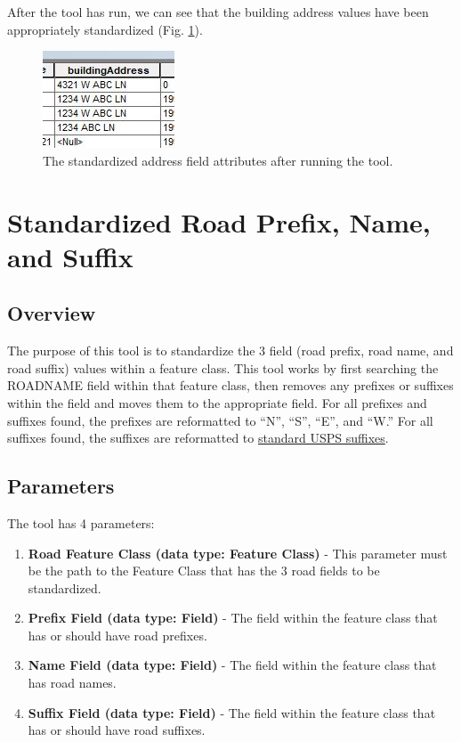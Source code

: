 \documentclass[openany]{book}
\providecommand{\tightlist}{%
  \setlength{\itemsep}{0pt}\setlength{\parskip}{0pt}}
\theoremstyle{definition}
\theoremstyle{definition}
\theoremstyle{definition}
\theoremstyle{remark}
\begin{document}
After the tool has run, we can see that the building address values have
been appropriately standardized (Fig. \ref{fig:std1after}).

\begin{figure}[H]

{\centering \includegraphics{figures/std1-after} 

}

\caption{The standardized address field attributes after running the tool.}\label{fig:std1after}
\end{figure}

\hypertarget{std3}{\chapter{Standardized Road Prefix, Name, and
Suffix}\label{std3}}

\section{Overview}\label{overview-7}

The purpose of this tool is to standardize the 3 field (road prefix,
road name, and road suffix) values within a feature class. This tool
works by first searching the ROADNAME field within that feature class,
then removes any prefixes or suffixes within the field and moves them to
the appropriate field. For all prefixes and suffixes found, the prefixes
are reformatted to ``N'', ``S'', ``E'', and ``W.'' For all suffixes
found, the suffixes are reformatted to
\href{https://github.com/allanbreyes/udacity-data-science/blob/master/p2/data/suffixes.csv}{standard
USPS suffixes}.

\section{Parameters}\label{parameters-7}

The tool has 4 parameters:

\begin{enumerate}
\def\labelenumi{\arabic{enumi}.}
\tightlist
\item
  \textbf{Road Feature Class (data type: Feature Class)} - This
  parameter must be the path to the Feature Class that has the 3 road
  fields to be standardized.
\item
  \textbf{Prefix Field (data type: Field)} - The field within the
  feature class that has or should have road prefixes.
\item
  \textbf{Name Field (data type: Field)} - The field within the feature
  class that has road names.
\item
  \textbf{Suffix Field (data type: Field)} - The field within the
  feature class that has or should have road suffixes.
\end{enumerate}
\end{document}
